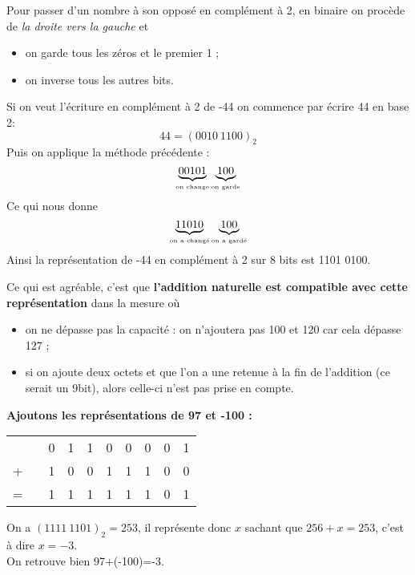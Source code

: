 \begin{methode}
    Pour passer d'un nombre à son opposé en complément à 2, en binaire on procède de \textit{la droite vers la gauche} et
    \begin{itemize}
        \item   on garde tous les zéros et le premier 1 ;
        \item   on \og inverse\fg{} tous les autres bits.
    \end{itemize}
\end{methode}

\begin{exemple}
    Si on veut l'écriture en complément à 2 de -44 on commence par écrire 44 en base 2:
    $$44=(0010\ 1100)_2$$
    Puis on applique la méthode précédente :
    $$\underbrace{00101}_{\textrm{\tiny on change}}\underbrace{100}_{\textrm{\tiny on garde}}$$
    Ce qui nous donne $$\underbrace{11010}_{\textrm{\tiny on a changé}}\underbrace{100}_{\textrm{\tiny on a gardé}}$$
    Ainsi la représentation de -44 en complément à 2 sur 8 bits est 1101 0100.
\end{exemple}
Ce qui est agréable, c'est que \textbf{l'addition naturelle est compatible avec cette représentation} dans la mesure où

\begin{itemize}
    \item   on ne dépasse pas la capacité : on n'ajoutera pas 100 et 120 car cela dépasse 127 ;
    \item   si on ajoute deux octets et que l'on a une retenue à la fin de l'addition (ce serait un 9\eme bit), alors
          celle-ci n'est pas prise en compte.
\end{itemize}

\begin{exemple}
    \textbf{Ajoutons les représentations de 97 et -100 :}
    \begin{center}

        \begin{tabular}{cccccccccc}
              &  & 0 & 1 & 1 & 0 & 0 & 0 & 0 & 1 \\

            + &  & 1 & 0 & 0 & 1 & 1 & 1 & 0 & 0 \\
            \hline
            = &  & 1 & 1 & 1 & 1 & 1 & 1 & 0 & 1 \\
        \end{tabular}
    \end{center}
    On a $(1111\ 1101)_2=253$, il représente donc $x$ sachant que $256+x=253$, c'est à dire $x=-3$.\\

    On retrouve bien 97+(-100)=-3.
\end{exemple}

